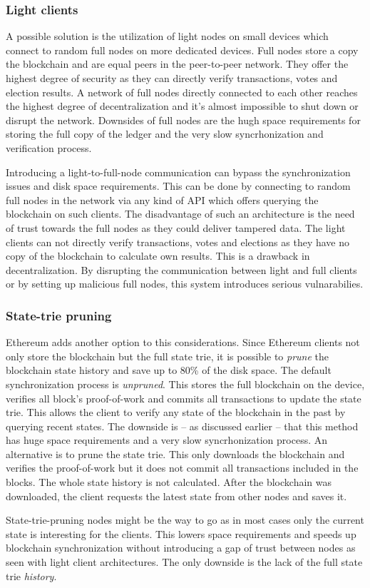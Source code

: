 \subsubsection{Light clients} %
A possible solution is the utilization of light nodes on small devices which connect to random full nodes on more dedicated devices. Full nodes store a copy the blockchain and are equal peers in the peer-to-peer network. They offer the highest degree of security as they can directly verify transactions, votes and election results. A network of full nodes directly connected to each other reaches the highest degree of decentralization and it's almost impossible to shut down or disrupt the network. Downsides of full nodes are the hugh space requirements for storing the full copy of the ledger and the very slow syncrhonization and verification process.\par
Introducing a light-to-full-node communication can bypass the synchronization issues and disk space requirements. This can be done by connecting to random full nodes in the network via any kind of API which offers querying the blockchain on such clients. The disadvantage of such an architecture is the need of trust towards the full nodes as they could deliver tampered data. The light clients can not directly verify transactions, votes and elections as they have no copy of the blockchain to calculate own results. This is a drawback in decentralization. By disrupting the communication between light and full clients or by setting up malicious full nodes, this system introduces serious vulnarabilies.
\subsubsection{State-trie pruning}
Ethereum adds another option to this considerations. Since Ethereum clients not only store the blockchain but the full state trie, it is possible to \textit{prune} the blockchain state history and save up to 80\% of the disk space. The default synchronization process is \textit{unpruned}. This stores the full blockchain on the device, verifies all block's proof-of-work and commits all transactions to update the state trie. This allows the client to verify any state of the blockchain in the past by querying recent states. The downside is -- as discussed earlier -- that this method has huge space requirements and a very slow syncrhonization process. An alternative is to prune the state trie. This only downloads the blockchain and verifies the proof-of-work but it does not commit all transactions included in the blocks. The whole state history is not calculated. After the blockchain was downloaded, the client requests the latest state from other nodes and saves it.\par
State-trie-pruning nodes might be the way to go as in most cases only the current state is interesting for the clients. This lowers space requirements and speeds up blockchain synchronization without introducing a gap of trust between nodes as seen with light client architectures. The only downside is the lack of the full state trie \textit{history}.

